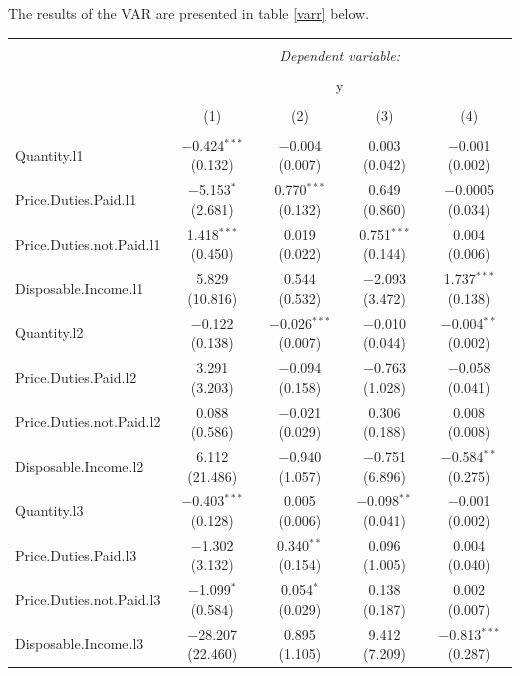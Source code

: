 \documentclass[11pt,preprint, authoryear]{elsarticle}
\let\origtable\table
\let\endorigtable\endtable
\renewenvironment{table}[1][2] {
    \expandafter\origtable\expandafter[H]
} {
    \endorigtable
}
\numberwithin{equation}{section}
\numberwithin{figure}{section}
\numberwithin{table}{section}
\begin{document}
The results of the VAR are presented in table \ref{varr} below. \newpage

\begin{table}[!htbp] \centering 
  \caption{} 
  \label{Vector Autoregression \label{varr}} 
\footnotesize 
\begin{tabular}{@{\extracolsep{1pt}}lcccc} 
\\[-1.8ex]\hline 
\hline \\[-1.8ex] 
 & \multicolumn{4}{c}{\textit{Dependent variable:}} \\ 
\cline{2-5} 
\\[-1.8ex] & \multicolumn{4}{c}{y} \\ 
\\[-1.8ex] & (1) & (2) & (3) & (4)\\ 
\hline \\[-1.8ex] 
 Quantity.l1 & $-$0.424$^{***}$ (0.132) & $-$0.004 (0.007) & 0.003 (0.042) & $-$0.001 (0.002) \\ 
  Price.Duties.Paid.l1 & $-$5.153$^{*}$ (2.681) & 0.770$^{***}$ (0.132) & 0.649 (0.860) & $-$0.0005 (0.034) \\ 
  Price.Duties.not.Paid.l1 & 1.418$^{***}$ (0.450) & 0.019 (0.022) & 0.751$^{***}$ (0.144) & 0.004 (0.006) \\ 
  Disposable.Income.l1 & 5.829 (10.816) & 0.544 (0.532) & $-$2.093 (3.472) & 1.737$^{***}$ (0.138) \\ 
  Quantity.l2 & $-$0.122 (0.138) & $-$0.026$^{***}$ (0.007) & $-$0.010 (0.044) & $-$0.004$^{**}$ (0.002) \\ 
  Price.Duties.Paid.l2 & 3.291 (3.203) & $-$0.094 (0.158) & $-$0.763 (1.028) & $-$0.058 (0.041) \\ 
  Price.Duties.not.Paid.l2 & 0.088 (0.586) & $-$0.021 (0.029) & 0.306 (0.188) & 0.008 (0.008) \\ 
  Disposable.Income.l2 & 6.112 (21.486) & $-$0.940 (1.057) & $-$0.751 (6.896) & $-$0.584$^{**}$ (0.275) \\ 
  Quantity.l3 & $-$0.403$^{***}$ (0.128) & 0.005 (0.006) & $-$0.098$^{**}$ (0.041) & $-$0.001 (0.002) \\ 
  Price.Duties.Paid.l3 & $-$1.302 (3.132) & 0.340$^{**}$ (0.154) & 0.096 (1.005) & 0.004 (0.040) \\ 
  Price.Duties.not.Paid.l3 & $-$1.099$^{*}$ (0.584) & 0.054$^{*}$ (0.029) & 0.138 (0.187) & 0.002 (0.007) \\ 
  Disposable.Income.l3 & $-$28.207 (22.460) & 0.895 (1.105) & 9.412 (7.209) & $-$0.813$^{***}$ (0.287) \\ 

\end{tabular}
\end{table}
\end{document}
